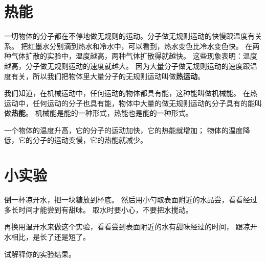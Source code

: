 \section{热能}\label{sec:5-3}

一切物体的分子都在不停地做无规则的运动。分子做无规则运动的快慢跟温度有关系。
把红墨水分别滴到热水和冷水中，可以看到，热水变色比冷水变色快。
在两种气体扩散的实验中，温度越高，两种气体扩散得就越快。
这些现象表明：温度越高，分子做无规则运动的速度就越大。
因为大量分子做无规则运动的速度跟温度有关，所以我们把物体里大量分子的无规则运动叫做\textbf{热运动}。

我们知道，在机械运动中，任何运动的物体都具有能，这种能叫做机械能。
在热运动中，任何运动的分子也具有能，物体中大量的做无规则运动的分子具有的能叫做\textbf{热能}。
机械能是能的一种形式，热能也是能的一种形式。

一个物体的温度升高，它的分子的运动加快，它的热能就增加；
    物体的温度降低，它的分子的运动变慢，它的热能就减少。


\section*{小实验}

倒一杯凉开水，把一块糖放到杯底。
然后用小勺取表面附近的水品尝，看看经过多长时间才能尝到有甜味。
取水时要小心，不要把水搅动。

再换用温开水来做这个实验，看看尝到表面附近的水有甜味经过的时间，
跟凉开水相比，是长了还是短了。

试解释你的实验结果。


